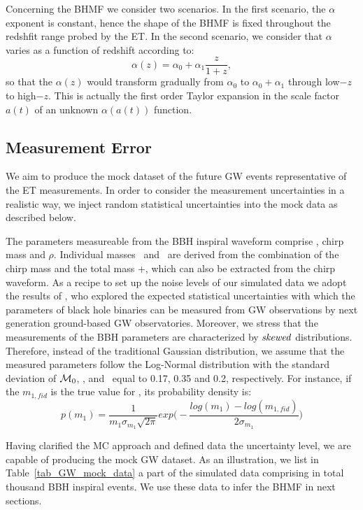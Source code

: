 \documentclass[twocolumn]{aastex62}
\begin{document}
Concerning the BHMF we consider two scenarios. In the first scenario, the $\alpha$ exponent is constant, hence the shape of the BHMF is fixed throughout the redshfit range probed by the ET. In the second scenario, we consider that $\alpha$ varies as a function of redshift according to:
 \begin{equation} \label{equ_alphaz}
\alpha(z) = \alpha_0 + \alpha_1\frac{z}{1+z} , 
 \end{equation}
so that the $\alpha(z)$ would transform gradually from $\alpha_0$ to $\alpha_0+\alpha_1$ through low$-z$ to high$-z$. This is actually the first order Taylor expansion in the scale factor $a(t)$ of an unknown $\alpha(a(t))$ function.

\subsection{Measurement Error} \label{sec_noiselevel}
We aim to produce the mock dataset of the future GW events representative of the ET  measurements. In order to consider the measurement uncertainties in a realistic way, we inject random statistical uncertainties into the mock data as described below.

The parameters measureable from the BBH inspiral waveform comprise \dl, chirp mass and $\rho$. Individual masses \mone\ and \mtwo\ are derived from the combination of the chirp mass and the total mass \mone+\mtwo, which can also be extracted from the chirp waveform. As a recipe to set up the noise levels of our simulated data we adopt the results of \citet{Ghosh2016}, who  explored the expected statistical uncertainties with which the parameters of black hole binaries can be measured from GW observations by next generation ground-based GW observatories. 
Moreover, we stress that the measurements of the BBH parameters are characterized by ${\it skewed}$ distributions. Therefore, instead of the traditional Gaussian distribution, we assume that the measured parameters follow the Log-Normal distribution with the standard deviation of  ${\cal M}_0$, \dl, and \mone\ equal to 0.17, 0.35 and 0.2, respectively. For instance, if the $m_{1,fid}$ is the true value for \mone, its probability density is:
 \begin{equation} \label{equ_lognorm}
p(m_1) = \frac{1}{m_1 \sigma_{m_1} \sqrt{2\pi}} exp \big(- \frac{log(m_1)-log(m_{1,fid})}{2\sigma_{m_1}} \big) 
 \end{equation}

Having clarified the MC approach and defined data the uncertainty level, we are capable of producing the mock GW dataset. As an illustration, we list in Table~\ref{tab_GW_mock_data} a 
part of the simulated data comprising in total thousand BBH inspiral events. 
We use these data to infer the BHMF in next sections.
\end{document}

